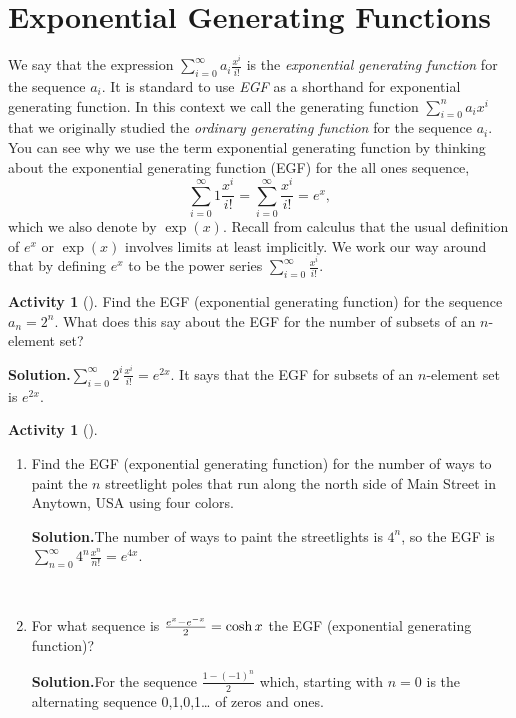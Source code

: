 \documentclass[10pt,]{book}
\theoremstyle{plain}
\theoremstyle{definition}
\newtheorem{activity}[project]{Activity}
\numberwithin{equation}{chapter}
\begin{document}
\section[{Exponential Generating Functions}]{Exponential Generating Functions}\label{section-25}
We say that the expression \(\sum_{i=0}^\infty a_i\frac{x^i}{i!}\) is the \emph{exponential generating function} for the sequence \(a_i\). It is standard to use \emph{EGF} as a shorthand for exponential generating function. In this context we call the generating function \(\sum_{i=0}^n a_ix^i\) that we originally studied the \emph{ordinary generating function} for the sequence \(a_i\). You can see why we use the term exponential generating function by thinking about the exponential generating function (EGF) for the all ones sequence,%
\begin{equation*}
\sum_{i=0}^\infty 1\frac{x^i}{i!} = \sum_{i=0}^\infty \frac{x^i}{i!}
=e^x,
\end{equation*}
which we also denote by \(\exp (x)\). Recall from calculus that the usual definition of \(e^x\) or \(\exp(x)\) involves limits at least implicitly. We work our way around that by defining \(e^x\) to be the power series \(\sum_{i=0}^\infty
\frac{x^i}{i!}\).%
\begin{activity}[]\label{activity-337}
Find the EGF (exponential generating function) for the sequence \(a_n=2^n\). What does this say about the EGF for the number of subsets of an \(n\)-element set?%
\par\medskip\noindent%
\textbf{Solution.}\quad \(\sum_{i=0}^\infty {2^i}\frac{x^i}{i!}=e^{2x}\). It says that the EGF for subsets of an \(n\)-element set is \(e^{2x}\).%
\end{activity}
\begin{activity}[]\label{paintinglightpoles}
~\par
\begin{enumerate}[label=(\alph*)]
 \item Find the EGF (exponential generating function) for the number of ways to paint the \(n\) streetlight poles that run along the north side of Main Street in Anytown, USA using four colors.%
\par\medskip\noindent%
\textbf{Solution.}\quad The number of ways to paint the streetlights is \(4^n\), so the EGF is \(\sum_{n=0}^\infty 4^n\frac{x^n}{n!}=e^{4x}\).%

~\par
\item For what sequence is \({e^x-e^{-x}\over 2} =\cosh x\) the EGF (exponential generating function)?%
\par\medskip\noindent%
\textbf{Solution.}\quad For the sequence \(\frac{1-(-1)^n}{2}\) which, starting with \(n=0\) is the alternating sequence 0,1,0,1\dots{} of zeros and ones.%

\end{enumerate}
\end{activity}
\end{document}

